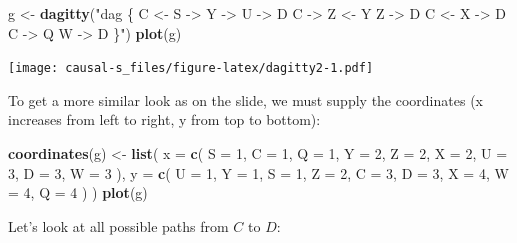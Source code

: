 \documentclass[
]{book}
\newenvironment{Shaded}{\begin{snugshade}}{\end{snugshade}}
\newcommand{\AttributeTok}[1]{\textcolor[rgb]{0.13,0.29,0.53}{#1}}
\newcommand{\DecValTok}[1]{\textcolor[rgb]{0.00,0.00,0.81}{#1}}
\newcommand{\FunctionTok}[1]{\textcolor[rgb]{0.13,0.29,0.53}{\textbf{#1}}}
\newcommand{\NormalTok}[1]{#1}
\newcommand{\OtherTok}[1]{\textcolor[rgb]{0.56,0.35,0.01}{#1}}
\newcommand{\SpecialCharTok}[1]{\textcolor[rgb]{0.81,0.36,0.00}{\textbf{#1}}}
\newcommand{\StringTok}[1]{\textcolor[rgb]{0.31,0.60,0.02}{#1}}
\begin{document}
\begin{Shaded}
\begin{Highlighting}[]
\NormalTok{g }\OtherTok{\textless{}{-}} \FunctionTok{dagitty}\NormalTok{(}\StringTok{"dag \{}
\StringTok{    C \textless{}{-} S {-}\textgreater{} Y {-}\textgreater{} U {-}\textgreater{} D}
\StringTok{    C {-}\textgreater{} Z \textless{}{-} Y}
\StringTok{    Z {-}\textgreater{} D}
\StringTok{    C \textless{}{-} X {-}\textgreater{} D}
\StringTok{    C {-}\textgreater{} Q}
\StringTok{    W {-}\textgreater{} D}
\StringTok{  \}"}\NormalTok{)}
\FunctionTok{plot}\NormalTok{(g)}
\end{Highlighting}
\end{Shaded}

\texttt{[image: causal-s\_files/figure-latex/dagitty2-1.pdf]}

To get a more similar look as on the slide, we must supply the coordinates (x increases from left to right, y from top to bottom):

\begin{Shaded}
\begin{Highlighting}[]
\FunctionTok{coordinates}\NormalTok{(g) }\OtherTok{\textless{}{-}} 
  \FunctionTok{list}\NormalTok{(}
    \AttributeTok{x =} 
      \FunctionTok{c}\NormalTok{(}
        \AttributeTok{S =} \DecValTok{1}\NormalTok{, }\AttributeTok{C =} \DecValTok{1}\NormalTok{, }\AttributeTok{Q =} \DecValTok{1}\NormalTok{, }\AttributeTok{Y =} \DecValTok{2}\NormalTok{, }\AttributeTok{Z =} \DecValTok{2}\NormalTok{, }
        \AttributeTok{X =} \DecValTok{2}\NormalTok{, }\AttributeTok{U =} \DecValTok{3}\NormalTok{, }\AttributeTok{D =} \DecValTok{3}\NormalTok{, }\AttributeTok{W =} \DecValTok{3}
\NormalTok{      ),}
    \AttributeTok{y =} 
      \FunctionTok{c}\NormalTok{(}
        \AttributeTok{U =} \DecValTok{1}\NormalTok{, }\AttributeTok{Y =} \DecValTok{1}\NormalTok{, }\AttributeTok{S =} \DecValTok{1}\NormalTok{, }\AttributeTok{Z =} \DecValTok{2}\NormalTok{, }\AttributeTok{C =} \DecValTok{3}\NormalTok{, }
        \AttributeTok{D =} \DecValTok{3}\NormalTok{, }\AttributeTok{X =} \DecValTok{4}\NormalTok{, }\AttributeTok{W =} \DecValTok{4}\NormalTok{, }\AttributeTok{Q =} \DecValTok{4}
\NormalTok{      )}
\NormalTok{  )}
\FunctionTok{plot}\NormalTok{(g)}
\end{Highlighting}
\end{Shaded}

Let's look at all possible paths from \(C\) to \(D\):

\begin{Shaded}
\end{Shaded}
\end{document}
